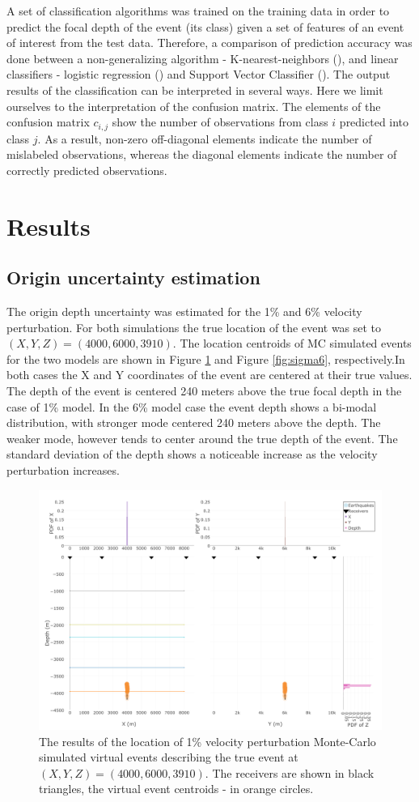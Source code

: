 \documentclass[letterpaper,11pt]{article}
\begin{document}
A set of classification algorithms was trained on the training data in order to predict the focal depth of the event (its class) given a set of features of an event of interest from the test data. Therefore, a comparison of prediction accuracy was done between a non-generalizing algorithm - K-nearest-neighbors (\cite{cover_nearest_1967}), and linear classifiers - logistic regression (\cite{jr_applied_2004}) and Support Vector Classifier (\cite{suykens_least_1999}). The output results of the classification can be interpreted in several ways. Here we limit ourselves to the interpretation of the confusion matrix. The elements of the confusion matrix $c_{i,j}$ show the number of observations from class $i$ predicted into class $j$. As a result, non-zero off-diagonal elements indicate the number of mislabeled observations, whereas the diagonal elements indicate the number of correctly predicted observations.
\section*{Results}
\subsection*{Origin uncertainty estimation}
The origin depth uncertainty was estimated for the 1\% and 6\% velocity perturbation. For both simulations the true location of the event was set to $(X,Y,Z) = (4000,6000,3910)$. The location centroids of MC simulated events for the two models are shown in Figure \ref{fig:sigma1} and Figure \ref{fig:sigma6}, respectively.In both cases the X and Y coordinates of the event are centered at their true values. The depth of the event is centered 240 meters above the true focal depth in the case of 1\% model. In the 6\% model case the event depth shows a bi-modal distribution, with stronger mode centered 240 meters above the depth. The weaker mode, however tends to center around the true depth of the event. The standard deviation of the depth shows a noticeable increase as the velocity perturbation increases.
\begin{figure}[htb]
\begin{center}
\includegraphics[width=0.6\linewidth,angle=0]{./AntonBiryukov_bibtex/Figure1_1pct.png}
\end{center}
\vspace{-4mm}
\caption{The results of the location of 1\% velocity perturbation Monte-Carlo simulated virtual events describing the true event at $(X,Y,Z) = (4000,6000,3910)$. The receivers are shown in black triangles, the virtual event centroids - in orange circles.}
\label{fig:sigma1}
\end{figure}
\end{document}
